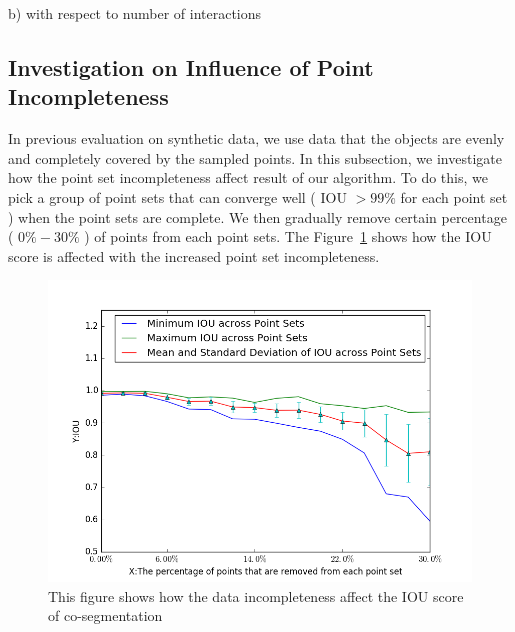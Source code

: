 b) with respect to number of interactions 

\subsection{Investigation on Influence of Point Incompleteness}
In previous evaluation on synthetic data, we use data that the objects are evenly and completely covered by the sampled points. In this subsection, we investigate how the point set incompleteness affect result of our algorithm. To do this, we pick a group of point sets that can converge well ( IOU $> 99\%$ for each point set ) when the point sets are complete. We then gradually remove certain percentage ( $0\%-30\%$ ) of points from each point sets. The Figure~\ref{fig:incompleteness} shows how the IOU score is affected with the increased point set incompleteness.
\begin{figure}[htb]
	\centering
	\includegraphics[width=\linewidth]{images/incompleteness/IOU.png}
	\caption{This figure shows how the data incompleteness affect the IOU score of co-segmentation}
	\label{fig:incompleteness}
\end{figure}

